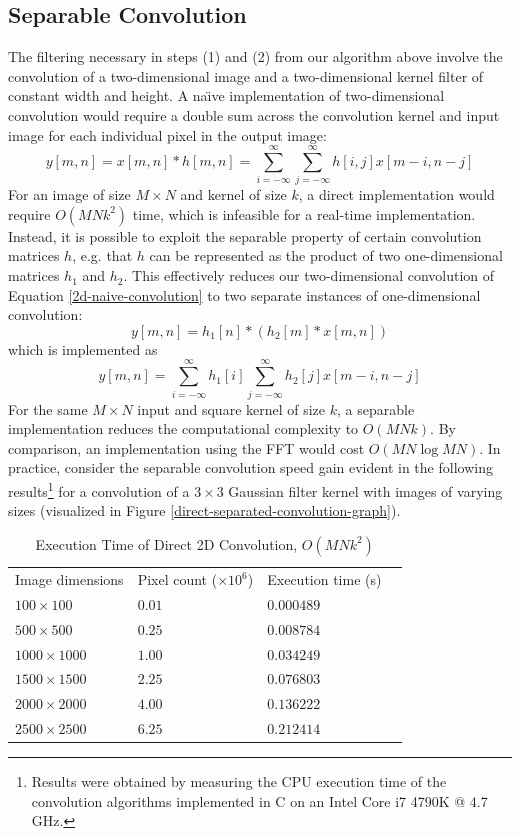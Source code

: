\documentclass[journal]{IEEEtran}
\begin{document}
\subsection{Separable Convolution}
The filtering necessary in steps (1) and (2) from our algorithm above involve the convolution of a two-dimensional image and a two-dimensional kernel filter of constant width and height. A na\"{\i}ve implementation of two-dimensional convolution would require a double sum across the convolution kernel and input image for each individual pixel in the output image:
\begin{equation}
	\label{2d-naive-convolution}
	y[m, n] = x[m, n] * h[m, n] = \sum_{i = -\infty}^{\infty} \sum_{j = -\infty}^{\infty} h[i, j] x[m - i, n - j]
\end{equation}
For an image of size $M \times N$ and kernel of size $k$, a direct implementation would require $O(MNk^2)$ time, which is infeasible for a real-time implementation. Instead, it is possible to exploit the separable property of certain convolution matrices $h$, e.g. that $h$ can be represented as the product of two one-dimensional matrices $h_1$ and $h_2$. This effectively reduces our two-dimensional convolution of Equation \eqref{2d-naive-convolution} to two separate instances of one-dimensional convolution:
\begin{equation}
	\label{separable-convolution-definition}
	y[m, n] = h_1[n] * (h_2[m] * x[m, n])
\end{equation}
which is implemented as
\begin{equation}
	\label{separable-convolution-formula}
	y[m, n] = \sum_{i = -\infty}^{\infty}h_1[i] \sum_{j = -\infty}^{\infty}h_2[j] x[m - i, n - j]
\end{equation}
For the same $M \times N$ input and square kernel of size $k$, a separable implementation reduces the computational complexity to $O(MNk)$. By comparison, an implementation using the FFT would cost $O(MN\log{MN})$. In practice, consider the separable convolution speed gain evident in the following results\footnote{Results were obtained by measuring the CPU execution time of the convolution algorithms implemented in C on an Intel Core i7 4790K @ 4.7 GHz.} for a convolution of a $3 \times 3$ Gaussian filter kernel with images of varying sizes (visualized in Figure \ref{direct-separated-convolution-graph}).
\begin{table}[H]
	\small
	\centering
	\caption{Execution Time of Direct 2D Convolution, $O(MNk^2)$}
	\label{convolution-complexity-comparison}
	\begin{tabular}{llll}
	 Image dimensions & Pixel count ($\times10^6$) & Execution time (s) \\
	 $100 \times 100$ & $0.01$ & $0.000489$ \\
	 $500 \times 500$ & $0.25$ & $0.008784$ \\
	 $1000 \times 1000$ & $1.00$ & $0.034249$ \\
	 $1500 \times 1500$ & $2.25$ & $0.076803$ \\
	 $2000 \times 2000$ & $4.00$ & $0.136222$ \\
	 $2500 \times 2500$ & $6.25$ & $0.212414$ \\
	\end{tabular}
\end{table}
\end{document}
